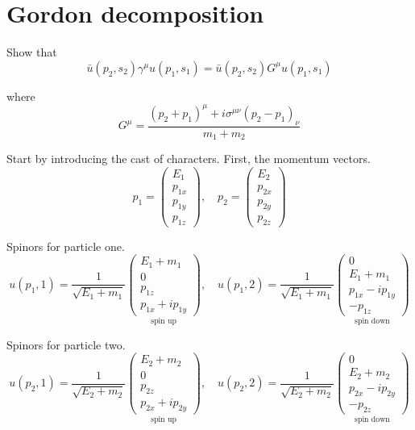 

\section*{Gordon decomposition}

Show that
\begin{equation*}
\bar{u}(p_2,s_2)\gamma^\mu u(p_1,s_1)
=\bar{u}(p_2,s_2)G^\mu u(p_1,s_1)
\end{equation*}

where
\begin{equation*}
G^\mu=\frac{(p_2+p_1)^\mu+i\sigma^{\mu\nu}(p_2-p_1)_\nu}{m_1+m_2}
\end{equation*}

Start by introducing the cast of characters.
First, the momentum vectors.
\begin{equation*}
p_1=\begin{pmatrix}E_1\\p_{1x}\\p_{1y}\\p_{1z}\end{pmatrix},\quad
p_2=\begin{pmatrix}E_2\\p_{2x}\\p_{2y}\\p_{2z}\end{pmatrix}
\end{equation*}

Spinors for particle one.
\begin{equation*}
u(p_1,1)=\frac{1}{\sqrt{E_1+m_1}}\underset{\text{spin up}}
{\begin{pmatrix}E_1+m_1\\0\\p_{1z}\\p_{1x}+ip_{1y}\end{pmatrix}},\quad
u(p_1,2)=\frac{1}{\sqrt{E_1+m_1}}\underset{\text{spin down}}
{\begin{pmatrix}0\\E_1+m_1\\p_{1x}-ip_{1y}\\-p_{1z}\end{pmatrix}}
\end{equation*}

Spinors for particle two.
\begin{equation*}
u(p_2,1)=\frac{1}{\sqrt{E_2+m_2}}\underset{\text{spin up}}
{\begin{pmatrix}E_2+m_2\\0\\p_{2z}\\p_{2x}+ip_{2y}\end{pmatrix}},\quad
u(p_2,2)=\frac{1}{\sqrt{E_2+m_2}}\underset{\text{spin down}}
{\begin{pmatrix}0\\E_2+m_2\\p_{2x}-ip_{2y}\\-p_{2z}\end{pmatrix}}
\end{equation*}

